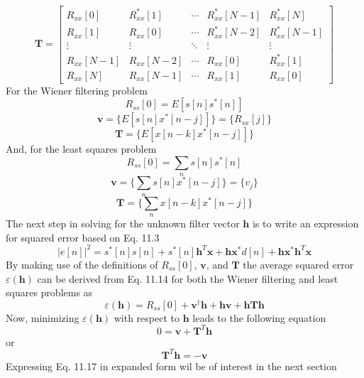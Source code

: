 \documentclass[11pt]{book}
\theoremstyle{example}
\begin{document}
\begin{equation}
	\mathbf{T}=
	\begin{bmatrix}
		R_{xx}[0] & R_{xx}^*[1] & \cdots&R_{xx}^*[N-1]&R_{xx}^*[N]\\
		R_{xx}[1] & R_{xx}[0] & \cdots & R_{xx}^*[N-2] & R_{xx}^*[N-1]\\
		\vdots & \vdots & \ddots & \vdots & \vdots\\
		R_{xx}[N-1] & R_{xx}[N-2] & \cdots & R_{xx}[0] & R_{xx}^*[1]\\
		R_{xx}[N] & R_{xx}[N-1] & \cdots & R_{xx}[1] & R_{xx}[0]
	\end{bmatrix}
\end{equation}
For the Wiener filtering problem
\begin{equation}
	R_{ss}[0]=E[s[n]s^*[n]]
\end{equation}
\begin{equation}
	\mathbf{v}=\{E[s[n]x^*[n-j]]\}=\{R_{sx}[j]\}
\end{equation}
\begin{equation}
	\mathbf{T}=\{E[x[n-k]x^*[n-j]]\}
\end{equation}
And, for the least squares problem
\begin{equation}
	R_{ss}[0]=\sum_n{s[n]s^*[n]}
\end{equation}
\begin{equation}
	\mathbf{v}=\{\sum_ns[n]x^*[n-j]\}=\{v_j\}
\end{equation}
\begin{equation}
	\mathbf{T}=\{\sum_nx[n-k]x^*[n-j]\}
\end{equation}
The next step in solving for the unknown filter vector $\mathbf{h}$ is to write an expression for squared error based on Eq. 11.3
\begin{equation}
	|e[n]|^2=s^*[n]s[n]+s^*[n]\mathbf{h}^T\mathbf{x}+\mathbf{h}\mathbf{x}^*d[n]+\mathbf{h}\mathbf{x}^*\mathbf{h}^T\mathbf{x}
\end{equation}
By making use of the definitions of $R_{ss}[0]$, $\mathbf{v}$, and $\mathbf{T}$ the average squared error  $\varepsilon(\mathbf{h})$ can be derived from Eq. 11.14 for both the Wiener filtering and least squares problems as
\begin{equation}
	\varepsilon(\mathbf{h})=R_{ss}[0]+\mathbf{v}^\dagger\mathbf{h}+\mathbf{h}\mathbf{v}+\mathbf{h}\mathbf{T}\mathbf{h}
\end{equation}
Now, minimizing $\varepsilon(\mathbf{h})$ with respect to $\mathbf{h}$ leads to the following equation
\begin{equation}
	0=\mathbf{v}+\mathbf{T}^T\mathbf{h}
\end{equation}
or
\begin{equation}
	\mathbf{T}^T\mathbf{h}=-\mathbf{v}
\end{equation}
Expressing Eq. 11.17 in expanded form wil be of interest in the next section


\backmatter
\end{document}

